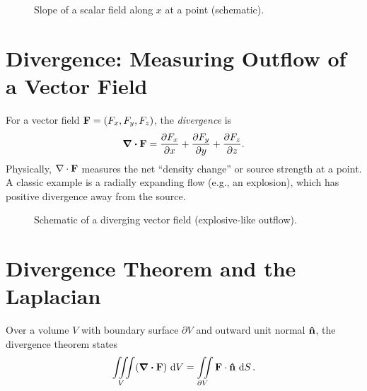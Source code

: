 \documentclass[11pt,a4paper]{article}
\begin{document}
\begin{figure}[h]
  \centering
  \caption{Slope of a scalar field along $x$ at a point (schematic).}
\end{figure}

\section{Divergence: Measuring Outflow of a Vector Field}
For a vector field $\vb{F} = (F_x,F_y,F_z)$, the \emph{divergence} is
\begin{equation}
  \div{\vb{F}} = \pdv{F_x}{x} + \pdv{F_y}{y} + \pdv{F_z}{z} .
\end{equation}
Physically, $\nabla\cdot\vb{F}$ measures the net ``density change'' or source strength at a point. A classic example is a radially expanding flow (e.g., an explosion), which has positive divergence away from the source.

\begin{figure}[h]
  \centering
  \caption{Schematic of a diverging vector field (explosive‐like outflow).}
\end{figure}

\section{Divergence Theorem and the Laplacian}
Over a volume $V$ with boundary surface $\partial V$ and outward unit normal $\vu{n}$, the divergence theorem states
\begin{equation}
  \iiint\limits_V (\div{\vb{F}})\,\dd{V} = \iint\limits_{\partial V} \vb{F} \cdot \vu{n}\,\dd{S} .
\end{equation}
\end{document}
